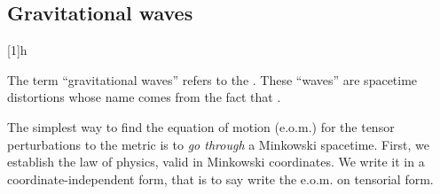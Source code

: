 \begin{draft}
{        %
    
            \begin{table}[h]\label[tab]{tab:CFTgrav:conformal_trafos:untit}
                {untitled_090224.tex}
            \end{table}
            
        }
    \end{draft}
    
    
    
    
    \begin{draft}
        {
            \section*{Gravitational waves}
    
    \newcommand*{\Chr}[2]{\ChristophelSym{#1}{#2}}  %
    \newcommand*{\barChr}[2]{%
        \ChristophelSym[\widebar{\Gamma}]{#1}{#2}}  %
    \newcommand*{\barg}{\widebar{g}}                %
    [1]{h}
    \newcommand*{\piG}{\ppi G\nped{N}}
    \newcommand*{\Lam}[2]{\ProjectionLambda{#1}{#2}}%
    
    
    
    
    
    
    
    The term ``gravitational waves'' refers to the . These ``waves'' are spacetime \normalsize{distortions} whose name comes from the fact that .
    
    The simplest way to find the equation of motion (e.o.m.) for the tensor perturbations to the metric is to \textit{go through} a Minkowski spacetime. First, we establish the law of physics, valid in Minkowski coordinates. We write it in a coordinate-independent form, that is to say write the e.o.m. on tensorial form.  
    
}
\end{draft}
